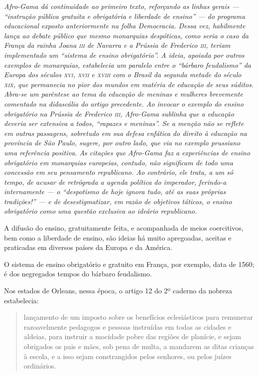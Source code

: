 \begin{didascalia}\itshape
Afro-Gama dá continuidade ao primeiro texto, reforçando as
linhas gerais --- ``instrução pública gratuita e obrigatória e liberdade
de ensino'' --- do programa educacional exposto anteriormente na folha
\textnormal{Democracia}. Dessa vez, habilmente lança ao debate público que
mesmo monarquias despóticas, como seria o caso da França da rainha
Joana \textsc{iii} de Navarra e a Prússia de Frederico \textsc{iii}, teriam implementado
um ``sistema de ensino obrigatório''. A ideia, apoiada por outros exemplos
de monarquias, estabelecia um paralelo entre o ``bárbaro feudalismo'' da
Europa dos séculos \textsc{xvi}, \textsc{xvii} e \textsc{xviii} com o Brasil da segunda metade do
século \textsc{xix}, que permanecia no pior dos mundos em matéria de educação de
seus súditos. Abra-se um parêntese ao tema da educação de meninas e
mulheres brevemente comentado na didascália do artigo precedente. Ao %
invocar o exemplo do ensino obrigatório na Prússia de Frederico \textsc{iii},
Afro-Gama sublinha que a educação deveria ser extensiva a
todos, ``rapazes e meninas''. Se a menção não se reflete em outras
passagens, sobretudo em sua defesa enfática do direito à educação na
província de São Paulo, sugere, por outro lado, que via no exemplo
prussiano uma referência positiva. As citações que Afro-Gama
faz a experiências de ensino obrigatório em monarquias europeias,
contudo, não significam de todo uma concessão em seu pensamento
republicano. Ao contrário, ele trata, a um só tempo, de acusar de
retrógrada a agenda política do imperador, ferindo-a internamente --- o
``despotismo de hoje ignora tudo, até as suas próprias tradições!'' --- e
de desestigmatizar, em razão de objetivos táticos, o ensino obrigatório
como uma questão exclusiva ao ideário republicano.
\end{didascalia}



A difusão do ensino, gratuitamente feita, e acompanhada de meios
coercitivos, bem como a liberdade de ensino, são ideias há muito
apregoadas, aceitas e praticadas em diversos países da Europa e da
América.

O sistema de ensino obrigatório e gratuito em França, por exemplo, data
de 1560; é dos negregados tempos do bárbaro feudalismo.

Nos estados de Orleans, nessa época, o artigo 12 do 2º caderno da
nobreza estabelecia:


\begin{quote}
lançamento de um imposto sobre os benefícios eclesiásticos para
remunerar razoavelmente pedagogos e pessoas instruídas em todas as
cidades e aldeias, para instruir a mocidade pobre das regiões de
planície, e sejam obrigados os pais e mães, sob pena de multa, a
mandarem as ditas crianças à escola, e a isso sejam constrangidos pelos
senhores, ou pelos juízes ordinários.
\end{quote}

